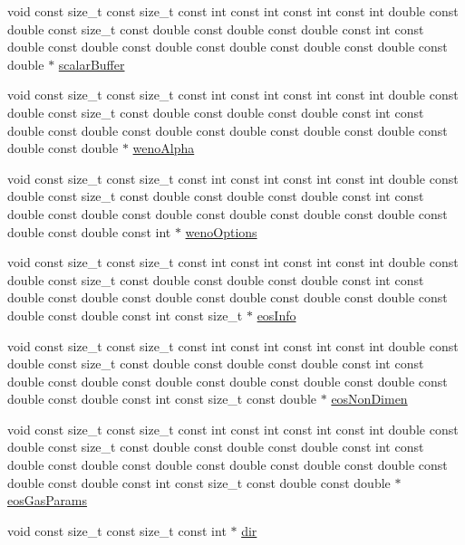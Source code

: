 \begin{DoxyCompactItemize}
\item 
void const size\+\_\+t const size\+\_\+t const int const int const int const int double const double const size\+\_\+t const double const double const double const int const double const double const double const double const double const double const double $\ast$ \hyperlink{WENOKernels_8H_ae53b6c0ad2686009b00d987ad35f4810}{scalar\+Buffer}
\item 
void const size\+\_\+t const size\+\_\+t const int const int const int const int double const double const size\+\_\+t const double const double const double const int const double const double const double const double const double const double const double const double $\ast$ \hyperlink{WENOKernels_8H_acfc9f23d594a43139ede4d58dc6a9cb8}{weno\+Alpha}
\item 
void const size\+\_\+t const size\+\_\+t const int const int const int const int double const double const size\+\_\+t const double const double const double const int const double const double const double const double const double const double const double const double const int $\ast$ \hyperlink{WENOKernels_8H_ab0a9a4f63f5ec810f436c1071ccb6eea}{weno\+Options}
\item 
void const size\+\_\+t const size\+\_\+t const int const int const int const int double const double const size\+\_\+t const double const double const double const int const double const double const double const double const double const double const double const double const int const size\+\_\+t $\ast$ \hyperlink{WENOKernels_8H_a9b67b225dd1b2bffc0623aa04a80bfc4}{eos\+Info}
\item 
void const size\+\_\+t const size\+\_\+t const int const int const int const int double const double const size\+\_\+t const double const double const double const int const double const double const double const double const double const double const double const double const int const size\+\_\+t const double $\ast$ \hyperlink{WENOKernels_8H_ab086e80006b932eb5dadc76f88126367}{eos\+Non\+Dimen}
\item 
void const size\+\_\+t const size\+\_\+t const int const int const int const int double const double const size\+\_\+t const double const double const double const int const double const double const double const double const double const double const double const double const int const size\+\_\+t const double const double $\ast$ \hyperlink{WENOKernels_8H_ae3d0a391e4050ddaf66a42b2596fa3cd}{eos\+Gas\+Params}
\item 
void const size\+\_\+t const size\+\_\+t const int $\ast$ \hyperlink{WENOKernels_8H_ac055ecf2f0c28b4f3676d05314d9840c}{dir}

\end{DoxyCompactItemize}
